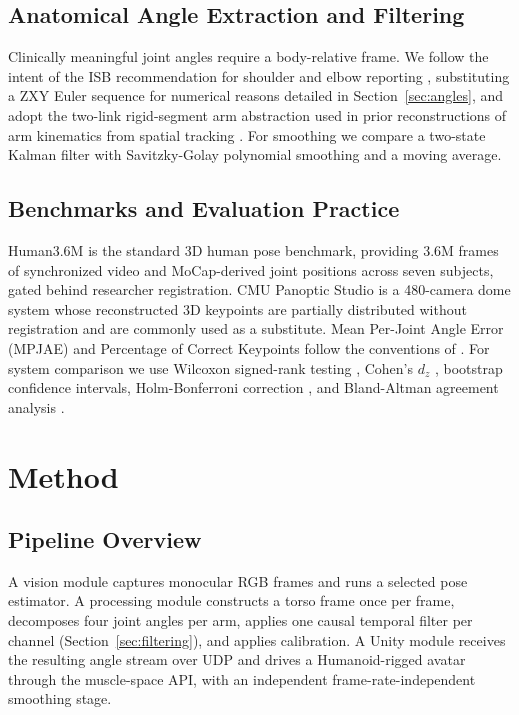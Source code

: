 \documentclass[conference]{IEEEtran}
\begin{document}
\subsection{Anatomical Angle Extraction and Filtering}
Clinically meaningful joint angles require a body-relative frame. We
follow the intent of the ISB recommendation for shoulder and elbow
reporting \cite{wu2005isb}, substituting a ZXY Euler sequence for
numerical reasons detailed in Section~\ref{sec:angles}, and adopt the
two-link rigid-segment arm abstraction used in prior reconstructions of
arm kinematics from spatial tracking \cite{biryukova2000kinematics,
koritnik2003kinematic}. For smoothing we compare a two-state Kalman
filter \cite{kalman1960new} with Savitzky-Golay polynomial smoothing
\cite{savitzky1964smoothing} and a moving average.

\subsection{Benchmarks and Evaluation Practice}
Human3.6M \cite{ionescu2014human36m} is the standard 3D human pose
benchmark, providing 3.6M frames of synchronized video and MoCap-derived
joint positions across seven subjects, gated behind researcher
registration. CMU Panoptic Studio \cite{joo2015panoptic} is a 480-camera
dome system whose reconstructed 3D keypoints are partially distributed
without registration and are commonly used as a substitute. Mean
Per-Joint Angle Error (MPJAE) and Percentage of Correct Keypoints follow
the conventions of \cite{yang2011articulated, mehta2017vnect}. For
system comparison we use Wilcoxon signed-rank testing
\cite{wilcoxon1945individual}, Cohen's $d_z$ \cite{cohen1988statistical},
bootstrap confidence intervals, Holm-Bonferroni correction
\cite{holm1979simple}, and Bland-Altman agreement analysis
\cite{bland1986statistical}.

\section{Method}
\label{sec:method}

\subsection{Pipeline Overview}
A vision module captures monocular RGB frames and runs a selected pose
estimator. A processing module constructs a torso frame once per frame,
decomposes four joint angles per arm, applies one causal temporal filter
per channel (Section~\ref{sec:filtering}), and applies calibration. A Unity module receives the
resulting angle stream over UDP and drives a Humanoid-rigged avatar
through the muscle-space API, with an independent frame-rate-independent
smoothing stage.
\end{document}
